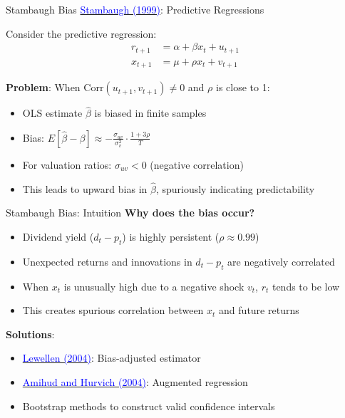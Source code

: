 \documentclass{beamer}
\begin{document}
\begin{frame}{Stambaugh Bias}
	\href{https://doi.org/10.1016/S0304-405X(99)00041-0}{\textcolor{blue}{Stambaugh (1999)}}: Predictive Regressions
	
	\vspace{5pt}
	Consider the predictive regression:
	\begin{align*}
		r_{t+1} &= \alpha + \beta x_t + u_{t+1} \\
		x_{t+1} &= \mu + \rho x_t + v_{t+1}
	\end{align*}
	
	\textbf{Problem}: When $\text{Corr}(u_{t+1}, v_{t+1}) \neq 0$ and $\rho$ is close to 1:
	\begin{itemize}
		\item OLS estimate $\hat{\beta}$ is \alert{biased} in finite samples
		\item Bias: $E[\hat{\beta} - \beta] \approx -\frac{\sigma_{uv}}{\sigma_v^2} \cdot \frac{1+3\rho}{T}$
		\item For valuation ratios: $\sigma_{uv} < 0$ (negative correlation)
		\item This leads to \alert{upward bias} in $\hat{\beta}$, spuriously indicating predictability
	\end{itemize}
\end{frame}

\begin{frame}{Stambaugh Bias: Intuition}
	\textbf{Why does the bias occur?}
	\begin{itemize}
		\item Dividend yield ($d_t - p_t$) is highly persistent ($\rho \approx 0.99$)
		\item Unexpected returns and innovations in $d_t - p_t$ are negatively correlated
		\item When $x_t$ is unusually high due to a negative shock $v_t$, $r_t$ tends to be low
		\item This creates spurious correlation between $x_t$ and future returns
	\end{itemize}
	
	\vspace{10pt}
	\textbf{Solutions}:
	\begin{itemize}
		\item \href{https://doi.org/10.1016/j.jfineco.2002.11.002}{\textcolor{blue}{Lewellen (2004)}}: Bias-adjusted estimator
		\item \href{https://doi.org/10.1017/S0022109000003227}{\textcolor{blue}{Amihud and Hurvich (2004)}}: Augmented regression
		\item Bootstrap methods to construct valid confidence intervals
	\end{itemize}
\end{frame}
\end{document}
